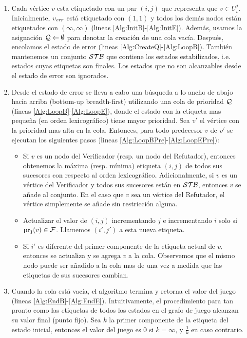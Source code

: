 \begin{enumerate}
  \item Cada vértice $v$ esta etiquetado con un par $(i, j)$ que representa que $v \in U_{i}^{j}$. Inicialmente, $v_{\mathit{err}}$ está etiquetado con $(1, 1)$ y todos los demás nodos están etiquetados con $(\infty, \infty)$ (lineas \ref{Alg:InitB}-\ref{Alg:InitE}). 
  Además, usamos la asignación $\mathcal{Q} \gets \emptyset$ para denotar la creación de una cola vacía. 
  Después, encolamos el estado de error (lineas \ref{Alg:CreateQ}-\ref{Alg:LoopB}). También mantenemos un conjunto $\mathcal{STB}$ que contiene los estados estabilizados, i.e. estados cuyas etiquetas son finales. Los estados que no son alcanzables desde el estado de error son ignorados.
  \item Desde el estado de error se lleva a cabo una búsqueda a lo ancho de abajo hacia arriba (bottom-up breadth-first) utilizando una cola de prioridad $\mathcal{Q}$ (lineas \ref{Alg:LoopB}-\ref{Alg:LoopE}), donde el estado con la etiqueta mas pequeña (en orden lexicográfico) tiene mayor prioridad. 
  Sea $v'$ el vértice con la prioridad mas alta en la cola. Entonces, para todo predecesor $v$ de $v'$ se ejecutan los siguientes pasos (lineas \ref{Alg:LoopBPre}-\ref{Alg:LoopEPre}):
  \begin{itemize}
    \item Si $v$ es un nodo del Verificador (resp. un nodo del Refutador), entonces obtenemos la máxima (resp. mínima) etiqueta $(i,j)$ de todos sus sucesores con respecto al orden lexicográfico. Adicionalmente, si $v$ es un vértice del Verificador y todos sus sucesores están en $\mathcal{STB}$, entonces $v$ se añade al conjunto. En el caso que $v$ sea un vértice del Refutador, 
    el vértice simplemente se añade sin restricción alguna. 
    \item Actualizar el valor de $(i,j)$ incrementando $j$ e incrementando $i$ solo si $\operatorname{pr}_{1}(v) \in \mathcal{F}$. Llamemos $(i',j')$ a esta nueva etiqueta.
    \item Si $i'$ es diferente del primer componente de la etiqueta actual de $v$, entonces se actualiza y se agrega $v$ a la cola. 
    Observemos que el mismo nodo puede ser añadido a la cola mas de una vez a medida que las etiquetas de sus sucesores cambian.
  \end{itemize}
  \item Cuando la cola está vacia, 
  el algoritmo termina y retorna el valor del juego (lineas \ref{Alg:EndB}-\ref{Alg:EndE}). 
  Intuitivamente, el procedimiento para tan pronto como las etiquetas de todos los estados en el grafo de juego alcanzan su valor final (punto fijo). 
  Sea $k$ la primer componente de la etiqueta del estado inicial, entonces el valor del juego es $0$ si 
  $k = \infty$, y $\frac{1}{k}$ en caso contrario.\\
\end{enumerate}
